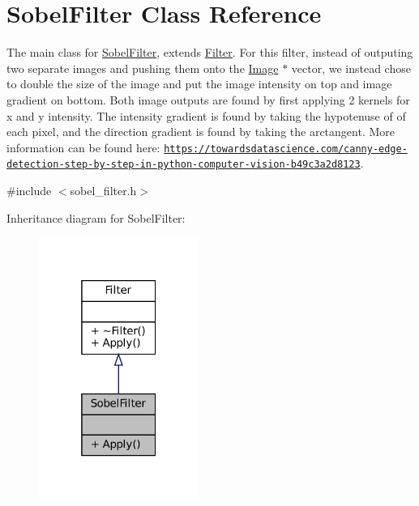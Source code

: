 \hypertarget{classSobelFilter}{}\section{Sobel\+Filter Class Reference}
\label{classSobelFilter}


The main class for \hyperlink{classSobelFilter}{Sobel\+Filter}, extends \hyperlink{classFilter}{Filter}. For this filter, instead of outputing two separate images and pushing them onto the \hyperlink{classImage}{Image} $\ast$ vector, we instead chose to double the size of the image and put the image intensity on top and image gradient on bottom. Both image outputs are found by first applying 2 kernels for x and y intensity. The intensity gradient is found by taking the hypotenuse of of each pixel, and the direction gradient is found by taking the arctangent. More information can be found here\+: \href{https://towardsdatascience.com/canny-edge-detection-step-by-step-in-python-computer-vision-b49c3a2d8123}{\tt https\+://towardsdatascience.\+com/canny-\/edge-\/detection-\/step-\/by-\/step-\/in-\/python-\/computer-\/vision-\/b49c3a2d8123}.  




{\ttfamily \#include $<$sobel\+\_\+filter.\+h$>$}



Inheritance diagram for Sobel\+Filter\+:\nopagebreak
\begin{figure}[H]
\begin{center}
\leavevmode
\includegraphics[width=148pt]{classSobelFilter__inherit__graph}
\end{center}
\end{figure}


